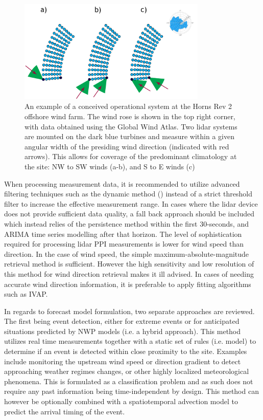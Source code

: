 \begin{figure}[htbp]
    \centering
        \includegraphics[width=0.8\textwidth]{graphics/discussion_layout.png}
    \caption{An example of a conceived operational system at the Horns Rev 2 offshore wind farm. The wind rose is shown in the top right corner, with data obtained using the Global Wind Atlas. Two lidar systems are mounted on the dark blue turbines and measure within a given angular width of the presiding wind direction (indicated with red arrows). This allows for coverage of the predominant climatology at the site: NW to SW winds (a-b), and S to E winds (c)}
    \label{fig:discussion_layout}
\end{figure}

When processing measurement data, it is recommended to utilize advanced filtering techniques such as the dynamic method (\cite{beck_dynamic_2017}) instead of a strict threshold filter to increase the effective measurement range. In cases where the lidar device does not provide sufficient data quality, a fall back approach should be included which instead relies of the persistence method within the first 30-seconds, and ARIMA time series modelling after that horizon. The level of sophistication required for processing lidar PPI measurements is lower for wind speed than direction. In the case of wind speed, the simple maximum-absolute-magnitude retrieval method is sufficient. However the high sensitivity and low resolution of this method for wind direction retrieval makes it ill advised. In cases of needing accurate wind direction information, it is preferable to apply fitting algorithms such as IVAP.

In regards to forecast model formulation, two separate approaches are reviewed. The first being event detection, either for extreme events or for anticipated situations predicted by NWP models (i.e. a hybrid approach). This method utilizes real time measurements together with a static set of rules (i.e. model) to determine if an event is detected within close proximity to the site. Examples include monitoring the upstream wind speed or direction gradient to detect approaching weather regimes changes, or other highly localized meteorological phenomena. This is formulated as a classification problem and as such does not require any past information being time-independent by design. This method can however be optionally combined with a spatiotemporal advection model to predict the arrival timing of the event.

